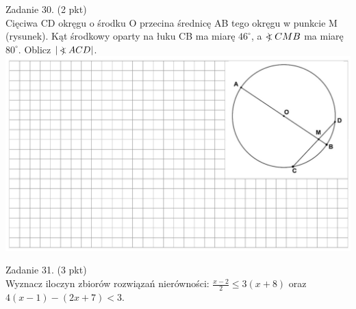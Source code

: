 \documentclass[10pt]{article}
\newcommand\Varangle{\mathop{{<\!\!\!\!\!\text{\small)}}\:}\nolimits}
\begin{document}
Zadanie 30. (2 pkt)\\
Cięciwa CD okręgu o środku O przecina średnicę AB tego okręgu w punkcie M (rysunek). Kąt środkowy oparty na łuku CB ma miarę \(46^{\circ}\), a \(\Varangle C M B\) ma miarę \(80^{\circ}\). Oblicz \(|\Varangle A C D|\).\\
\includegraphics[max width=\textwidth, center]{2024_11_21_23d228cacd5e4a9a3f86g-10}

Zadanie 31. (3 pkt)\\
Wyznacz iloczyn zbiorów rozwiązań nierówności: \(\frac{x-2}{2} \leq 3(x+8)\) oraz \(4(x-1)-(2 x+7)<3\).
\end{document}
